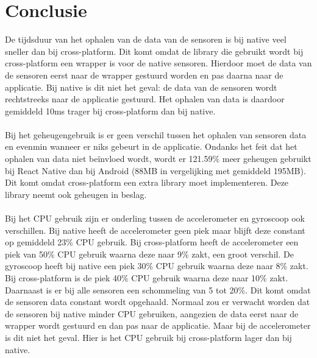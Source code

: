 \section{Conclusie}
De tijdsduur van het ophalen van de data van de sensoren is bij native veel sneller dan bij cross-platform.
Dit komt omdat de library die gebruikt wordt bij cross-platform een wrapper is voor de native sensoren.
Hierdoor moet de data van de sensoren eerst naar de wrapper gestuurd worden en pas daarna naar de applicatie.
Bij native is dit niet het geval: de data van de sensoren wordt rechtstreeks naar de applicatie gestuurd.
Het ophalen van data is daardoor gemiddeld 10ms trager bij cross-platform dan bij native.
\\\\
Bij het geheugengebruik is er geen verschil tussen het ophalen van sensoren data en evenmin wanneer er 
niks gebeurt in de applicatie. Ondanks het feit dat het ophalen van data niet beïnvloed 
wordt, wordt er 121.59\% meer geheugen gebruikt bij React Native dan 
bij Android (88MB in vergelijking met gemiddeld 195MB). Dit komt omdat cross-platform een extra 
library moet implementeren. Deze library neemt ook geheugen in beslag.
\\\\
Bij het CPU gebruik zijn er onderling tussen de accelerometer en gyroscoop ook verschillen. Bij native 
heeft de accelerometer geen piek maar blijft deze constant op gemiddeld 23\% CPU gebruik. Bij cross-platform heeft
de accelerometer een piek van 50\% CPU gebruik waarna deze naar 9\% zakt, een groot verschil. 
De gyroscoop heeft bij native een piek 30\% CPU gebruik waarna deze naar 8\% zakt. Bij cross-platform
is de piek 40\% CPU gebruik waarna deze naar 10\% zakt. Daarnaast is er bij alle sensoren een schommeling van 5 tot 20\%. 
Dit komt omdat de sensoren data constant wordt opgehaald. Normaal zou er verwacht worden dat de sensoren bij native 
minder CPU gebruiken, aangezien de data eerst naar de wrapper wordt gestuurd en dan pas naar de applicatie. Maar bij 
de accelerometer is dit niet het geval. Hier is het CPU gebruik bij cross-platform lager dan bij native.
\\\\
